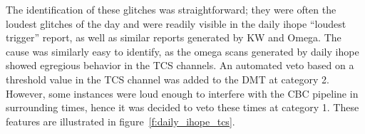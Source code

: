 The identification of these glitches was straightforward; they were
often the loudest glitches of the day and were readily visible in the
daily ihope ``loudest trigger'' report, as well as similar reports
generated by KW and Omega.  The cause was similarly easy to identify,
as the omega scans generated by daily ihope showed egregious behavior
in the TCS channels.  An automated veto based on a threshold value in
the TCS channel was added to the DMT at category 2.  However, some
instances were loud enough to interfere with the CBC pipeline in
surrounding times, hence it was decided to veto these times at
category 1.  These features are illustrated in
figure~\ref{f:daily_ihope_tcs}.  


%
% 

